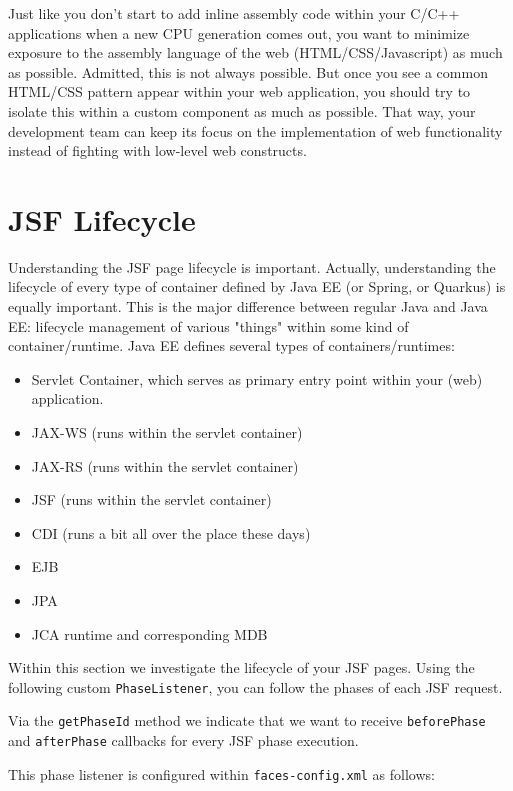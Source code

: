 Just like you don't start to add inline assembly code within your C/C++ applications when a new CPU generation comes out,
you want to minimize exposure to the assembly language of the web (HTML/CSS/Javascript) as much as possible.
Admitted, this is not always possible.
But once you see a common HTML/CSS pattern appear within your web application,
you should try to isolate this within a custom component as much as possible.
That way, your development team can keep its focus on the implementation of web functionality instead of fighting with low-level web constructs.

\section{JSF Lifecycle}
Understanding the JSF page lifecycle is important.
Actually, understanding the lifecycle of every type of container defined by Java EE (or Spring, or Quarkus) is equally important.
This is the major difference between regular Java and Java EE: lifecycle management of various "things" within some kind of container/runtime.
Java EE defines several types of containers/runtimes:
\begin{itemize}
	\item Servlet Container, which serves as primary entry point within your (web) application.
	\item JAX-WS (runs within the servlet container)
	\item JAX-RS (runs within the servlet container)
	\item JSF (runs within the servlet container)
	\item CDI (runs a bit all over the place these days)
	\item EJB
	\item JPA
	\item JCA runtime and corresponding MDB
\end{itemize}
Within this section we investigate the lifecycle of your JSF pages.
Using the following custom \texttt{PhaseListener}, you can follow the phases of each JSF request.

Via the \texttt{getPhaseId} method we indicate that we want to receive \texttt{beforePhase} and \texttt{afterPhase} callbacks for every JSF phase execution.

This phase listener is configured within \texttt{faces-config.xml} as follows:


